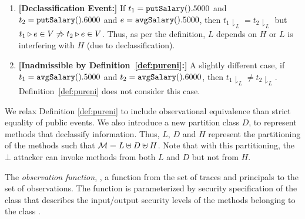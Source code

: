 \documentclass[acmsmall,screen,review, nonacm]{acmart}
\begin{document}
\begin{enumerate}


\item \textbf{[Declassification Event:]}
If $t_1 = \texttt{putSalary}().5000$ and  $t_2 = \texttt{putSalary}().6000$ and $e = \texttt{avgSalary}().5000$, then $t_1\downharpoonright_L = t_2\downharpoonright_L$ but  $t_1 \triangleright e \in V \not \Rightarrow t_2 \triangleright e \in V$. Thus, as per the definition, $L$ depends on $H$ or $L$ is interfering with $H$ (due to declassification).

\item \textbf{[Inadmissible by Definition~\ref{def:pureni}:]}
A slightly different case,  if $t_1 = \texttt{avgSalary}().5000$ and  $t_2 = \texttt{avgSalary}().6000$, then $t_1\downharpoonright_L \ne t_2\downharpoonright_L$. Definition~\ref{def:pureni} does not consider this case.

\end{enumerate}

We relax Definition \ref{def:pureni} to include observational equivalence  than strict equality of public events.
We also introduce a new partition class $D$, to represent methods that declassify information. Thus, $L$, $D$ and $H$ represent the partitioning of the methods such that $\mathcal{M} = L \uplus D \uplus H$.
Note that with this partitioning, the $\bot$ attacker can invoke methods from both $L$ and $D$ but not from $H$.



The \emph{observation function}, , a function from the set of traces  and  principals to the set of observations.
The function is parameterized by security specification of the class that describes the input/output security levels of the methods belonging to the class \classpart.
\end{document}
